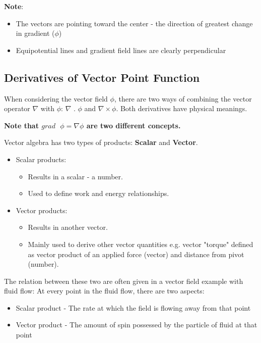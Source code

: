 \documentclass[10pt,a4paper]{article}
\begin{document}
\textbf{Note}:
\begin{itemize}
    \item The vectors are pointing toward the center - the direction of greatest change in gradient ($\phi$)
    \item Equipotential lines and gradient field lines are clearly perpendicular
\end{itemize} 

\subsection{Derivatives of Vector Point Function}

When considering the vector field $\phi$, there are two ways of combining the vector operator
$\nabla$ with $\phi$: $\nabla \textbf{ . }\phi$ and $\nabla \times \phi$. Both derivatives have
physical meanings.

\textbf{Note that $grad\text{ }\phi = \nabla\phi$ are two different concepts.} 

Vector algebra has two types of products: \textbf{Scalar} and \textbf{Vector}. 
\begin{itemize}
    \item Scalar products: 
    \begin{itemize}
        \item Results in a scalar - a number.
        \item Used to define work and energy relationships.
    \end{itemize}
    \item Vector products:
    \begin{itemize}
        \item Results in another vector.
        \item Mainly used to derive other vector quantities e.g. vector "torque" defined as vector
        product of an applied force (vector) and distance from pivot (number).
    \end{itemize}
\end{itemize}

The relation between these two are often given in a vector field example with fluid flow: At every point
in the fluid flow, there are two aspects:
\begin{itemize}
    \item Scalar product - The rate at which the field is flowing away from that point
    \item Vector product - The amount of spin possessed by the particle of fluid at that point
\end{itemize}
\end{document}
